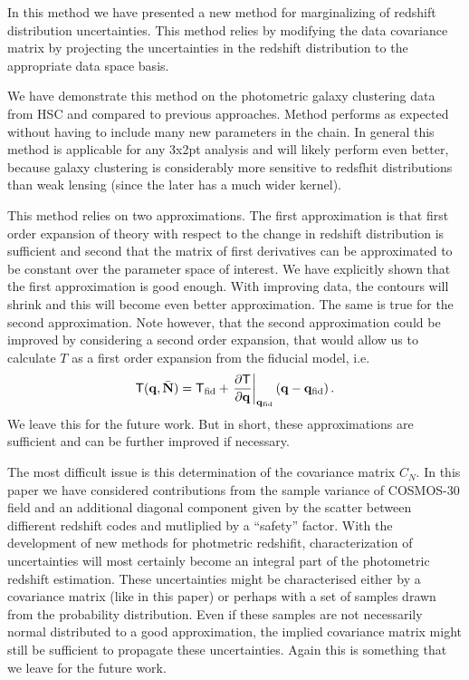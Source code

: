 \documentclass[a4paper,11pt]{article}
\newcommand{\vN}{\mathbf{N}}
\begin{document}
In this method we have presented a new method for marginalizing of redshift distribution uncertainties. This method relies by modifying the data covariance matrix by projecting the uncertainties in the redshift distribution to the appropriate data space basis.


We have demonstrate this method on the photometric galaxy clustering data from HSC and compared to previous approaches. Method performs as expected without having to include many new parameters in the chain. In general this method is applicable for any 3x2pt analysis and will likely perform even better, because galaxy clustering is considerably more sensitive to redsfhit distributions than weak lensing (since the later has a much wider kernel).

This method relies on two approximations. The first approximation is that first order expansion of theory with respect to the change in redshift distribution is sufficient and second that the matrix of first derivatives can be approximated to be constant over the parameter space of interest. We have explicitly shown that the first approximation is good enough. With improving data, the contours will shrink and this will become even better approximation. The same is true for the second approximation. Note however, that the second approximation could be improved by considering a second order expansion, that would allow us to calculate $T$ as a first order expansion from the fiducial model, i.e.
\begin{equation}
        {\sf T} ({{\bf q},\bar{\vN}}) = {\sf T}_{\rm fid} + \left. \frac{\partial \sf T}{\partial {\bf q}}\right|_{{\bf q_{\rm fid}}} \left({\bf q} - {\bf q_{\rm fid}}\right).
        \label{eq:Tmat}
\end{equation}
We leave this for the future work. But in short, these approximations are sufficient and can be further improved if necessary.


The most difficult issue is this determination of the covariance matrix $C_N$. In this paper we have considered contributions from the sample variance of COSMOS-30 field and an additional diagonal component given by the scatter between diffierent redshift codes and mutliplied by a ``safety'' factor. With the development of new methods for  photmetric redshifit, characterization of uncertainties will most certainly become an integral part of the photometric redshift estimation. These uncertainties might be characterised either by a covariance matrix (like in this paper) or perhaps with a set of samples drawn from the probability distribution. Even if these samples are not necessarily normal distributed to a good approximation, the implied covariance matrix might still be sufficient to propagate these uncertainties. Again this is something that we leave for the future work.
\end{document}
